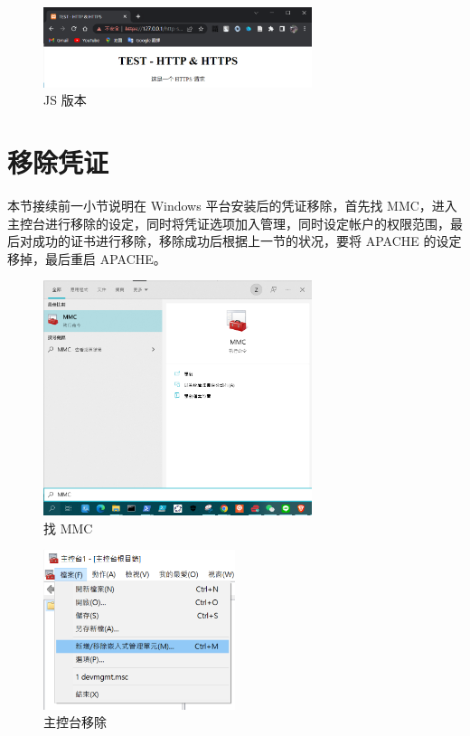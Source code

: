 \begin{figure}[htb]
\centering 
\includegraphics[width=0.70\textwidth]{img/ch1s2m16.png} 
\caption{JS 版本}
\label{Test}
\end{figure}


\section{移除凭证}

本节接续前一小节说明在 Windows 平台安装后的凭证移除，首先找 MMC，进入主控台进行移除的设定，同时将凭证选项加入管理，同时设定帐户的权限范围，最后对成功的证书进行移除，移除成功后根据上一节的状况，要将 APACHE 的设定移掉，最后重启 APACHE。

\begin{figure}[htb]
\centering 
\includegraphics[width=0.70\textwidth]{img/ch1s3m1.png} 
\caption{找 MMC}
\label{Test}
\end{figure}

\begin{figure}[htb]
\centering 
\includegraphics[width=0.50\textwidth]{img/ch1s3m2.png} 
\caption{主控台移除}
\label{Test}
\end{figure}

